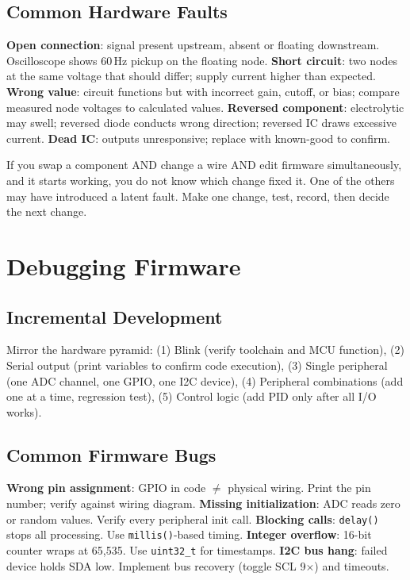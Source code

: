 \subsection{Common Hardware Faults}
\textbf{Open connection}: signal present upstream, absent or floating downstream. Oscilloscope shows 60\,Hz pickup on the floating node. \textbf{Short circuit}: two nodes at the same voltage that should differ; supply current higher than expected. \textbf{Wrong value}: circuit functions but with incorrect gain, cutoff, or bias; compare measured node voltages to calculated values. \textbf{Reversed component}: electrolytic may swell; reversed diode conducts wrong direction; reversed IC draws excessive current. \textbf{Dead IC}: outputs unresponsive; replace with known-good to confirm.

\begin{warningbox}
If you swap a component AND change a wire AND edit firmware simultaneously, and it starts working, you do not know which change fixed it. One of the others may have introduced a latent fault. Make one change, test, record, then decide the next change.
\end{warningbox}

\section{Debugging Firmware}

\subsection{Incremental Development}
Mirror the hardware pyramid: (1) Blink (verify toolchain and MCU function), (2) Serial output (print variables to confirm code execution), (3) Single peripheral (one ADC channel, one GPIO, one I2C device), (4) Peripheral combinations (add one at a time, regression test), (5) Control logic (add PID only after all I/O works).

\subsection{Common Firmware Bugs}
\textbf{Wrong pin assignment}: GPIO in code $\neq$ physical wiring. Print the pin number; verify against wiring diagram. \textbf{Missing initialization}: ADC reads zero or random values. Verify every peripheral init call. \textbf{Blocking calls}: \texttt{delay()} stops all processing. Use \texttt{millis()}-based timing. \textbf{Integer overflow}: 16-bit counter wraps at 65,535. Use \texttt{uint32\_t} for timestamps. \textbf{I2C bus hang}: failed device holds SDA low. Implement bus recovery (toggle SCL 9$\times$) and timeouts.

